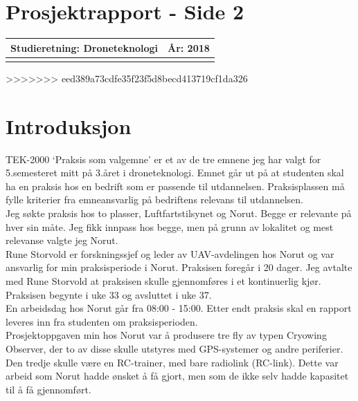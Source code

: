 \documentclass[12pt, a4paper]{article}
\begin{document}
\section{Prosjektrapport - Side 2}

\begin{tabular}{ | l | l | }
	\hline
	\textbf{Studieretning: Droneteknologi}\hspace{5cm} & \textbf{År: 2018} \\
	\hline
	\vspace{1cm}
	\hline
\end{tabular}


\clearpage
\begin{minipage}[b]{1\linewidth}
	\tableofcontents
	\vspace{.5cm}
\end{minipage}
\begin{minipage}[b]{1\linewidth}
	\listoffigures
\end{minipage}
\clearpage
>>>>>>> eed389a73cdfe35f23f5d8becd413719cf1da326

\section{Introduksjon}
TEK-2000 `Praksis som valgemne' er et av de tre emnene jeg har valgt for 5.semesteret mitt på 3.året i droneteknologi. Emnet går ut på at studenten skal ha en praksis hos en bedrift som er passende til utdannelsen. Praksisplassen må fylle kriterier fra emneansvarlig på bedriftens relevans til utdannelsen. \\


Jeg søkte praksis hos to plasser, Luftfartstilsynet og Norut. Begge er relevante på hver sin måte. Jeg fikk innpass hos begge, men på grunn av lokalitet og mest relevanse valgte jeg Norut.\\

Rune Storvold er forskningssjef og leder av UAV-avdelingen hos Norut og var ansvarlig for min praksisperiode i Norut. Praksisen foregår i 20 dager. Jeg avtalte med Rune Storvold at praksisen skulle gjennomføres i et kontinuerlig kjør. Praksisen begynte i uke 33 og avsluttet i uke 37.\\


En arbeidsdag hos Norut går fra 08:00 - 15:00. Etter endt praksis skal en rapport leveres inn fra studenten om praksisperioden.\\
Prosjektoppgaven min hos Norut var å produsere tre fly av typen Cryowing Observer, der to av disse skulle utstyres med GPS-systemer og andre periferier. Den tredje skulle være en RC-trainer, med bare radiolink (RC-link). Dette var arbeid som Norut hadde ønsket å få gjort, men som de ikke selv hadde kapasitet til å få gjennomført.\\ 
\end{document}
